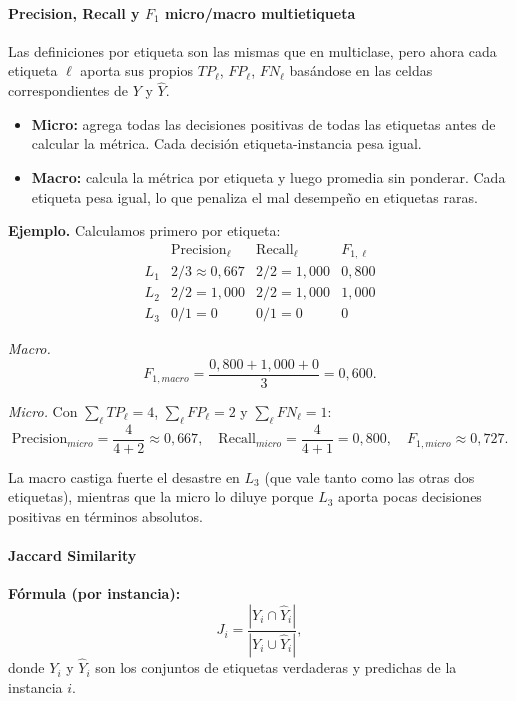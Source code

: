 \documentclass[12pt,oneside]{report}
\begin{document}
\paragraph{Precision, Recall y $F_1$ micro/macro multietiqueta}

Las definiciones por etiqueta son las mismas que en multiclase, pero
ahora cada etiqueta $\ell$ aporta sus propios $TP_\ell$, $FP_\ell$,
$FN_\ell$ basándose en las celdas correspondientes de $Y$ y $\hat Y$.
\begin{itemize}[leftmargin=*]
  \item \textbf{Micro:} agrega todas las decisiones positivas de todas
  las etiquetas antes de calcular la métrica. Cada decisión
  etiqueta-instancia pesa igual.
  \item \textbf{Macro:} calcula la métrica por etiqueta y luego promedia
  sin ponderar. Cada etiqueta pesa igual, lo que penaliza el mal
  desempeño en etiquetas raras.
\end{itemize}

\textbf{Ejemplo.} Calculamos primero por etiqueta:
\[
\begin{array}{l|ccc}
 & \mathrm{Precision}_\ell & \mathrm{Recall}_\ell & F_{1,\ell} \\
\hline
L_1 & 2/3\approx 0{,}667 & 2/2 = 1{,}000 & 0{,}800 \\
L_2 & 2/2 = 1{,}000      & 2/2 = 1{,}000 & 1{,}000 \\
L_3 & 0/1 = 0            & 0/1 = 0       & 0
\end{array}
\]

\emph{Macro.}
\[
F_{1,macro}=\frac{0{,}800+1{,}000+0}{3}=0{,}600.
\]

\emph{Micro.} Con $\sum_\ell TP_\ell=4$, $\sum_\ell FP_\ell=2$ y
$\sum_\ell FN_\ell=1$:
\[
\mathrm{Precision}_{micro}=\frac{4}{4+2}\approx 0{,}667,\quad
\mathrm{Recall}_{micro}=\frac{4}{4+1}=0{,}800,\quad
F_{1,micro}\approx 0{,}727.
\]

La macro castiga fuerte el desastre en $L_3$ (que vale tanto como las
otras dos etiquetas), mientras que la micro lo diluye porque $L_3$
aporta pocas decisiones positivas en términos absolutos.

\paragraph{Jaccard Similarity}

\textbf{Fórmula (por instancia):}
\[
J_i = \frac{|Y_i \cap \hat{Y}_i|}{|Y_i \cup \hat{Y}_i|},
\]
donde $Y_i$ y $\hat{Y}_i$ son los conjuntos de etiquetas verdaderas y
predichas de la instancia $i$.
\end{document}
